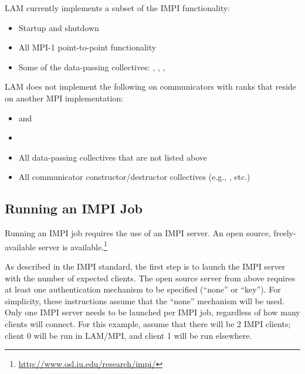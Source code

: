 LAM currently implements a subset of the IMPI functionality:

\begin{itemize}
\item Startup and shutdown

\item All MPI-1 point-to-point functionality
  
\item Some of the data-passing collectives:
  , ,
  , 
\end{itemize}

LAM does not implement the following on communicators with ranks that
reside on another MPI implementation:

\begin{itemize}
\item {} and 

\item {}

\item All data-passing collectives that are not listed above

\item All communicator constructor/destructor collectives (e.g.,
  , etc.)
\end{itemize}


\subsection{Running an IMPI Job}

Running an IMPI job requires the use of an IMPI
server. An open source, freely-available server is
available.\footnote{\url{http://www.osl.iu.edu/research/impi/}}

As described in the IMPI standard, the first step is to launch the
IMPI server with the number of expected clients.  The open source
server from above requires at least one authentication mechanism to be
specified (``none'' or ``key'').  For simplicity, these instructions
assume that the ``none'' mechanism will be used.  Only one IMPI server
needs to be launched per IMPI job, regardless of how many clients will
connect.
%
For this example, assume that there will be 2 IMPI clients; client 0
will be run in LAM/MPI, and client 1 will be run elsewhere.  

